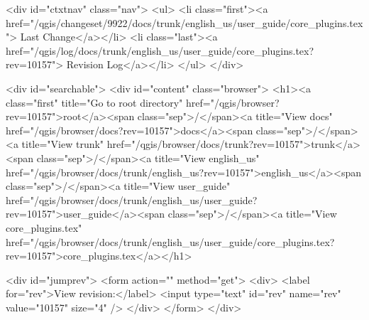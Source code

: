 <div id="ctxtnav" class="nav">
 <ul>
  <li class="first"><a href="/qgis/changeset/9922/docs/trunk/english_us/user_guide/core_plugins.tex">
   Last Change</a></li>
  <li class="last"><a href="/qgis/log/docs/trunk/english_us/user_guide/core_plugins.tex?rev=10157">
   Revision Log</a></li>
 </ul>
</div>


<div id="searchable">
<div id="content" class="browser">
 <h1><a class="first" title="Go to root directory" href="/qgis/browser?rev=10157">root</a><span class="sep">/</span><a title="View docs" href="/qgis/browser/docs?rev=10157">docs</a><span class="sep">/</span><a title="View trunk" href="/qgis/browser/docs/trunk?rev=10157">trunk</a><span class="sep">/</span><a title="View english_us" href="/qgis/browser/docs/trunk/english_us?rev=10157">english_us</a><span class="sep">/</span><a title="View user_guide" href="/qgis/browser/docs/trunk/english_us/user_guide?rev=10157">user_guide</a><span class="sep">/</span><a title="View core_plugins.tex" href="/qgis/browser/docs/trunk/english_us/user_guide/core_plugins.tex?rev=10157">core_plugins.tex</a></h1>

 <div id="jumprev">
  <form action="" method="get">
   <div>
    <label for="rev">View revision:</label>
    <input type="text" id="rev" name="rev" value="10157" size="4" />
   </div>
  </form>
 </div>

 

